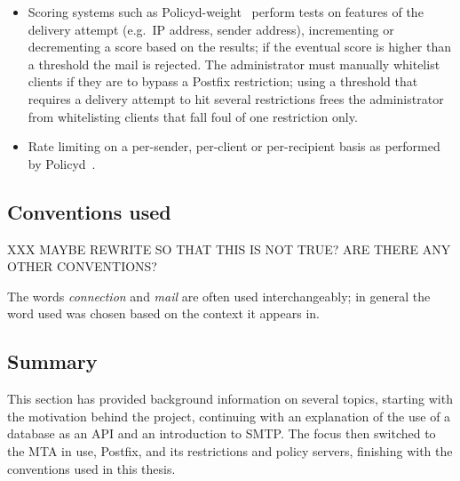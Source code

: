 \begin{itemize}
        \begin{table}[ht]
            \caption{Summary of rejections}\label{Summary of rejections}
            
        \end{table}

    \item Scoring systems such as Policyd-weight~\cite{policyd-weight}
        perform tests on features of the delivery attempt (e.g.\ \gls{IP}
        address, sender address), incrementing or decrementing a score
        based on the results; if the eventual score is higher than a
        threshold the mail is rejected.  The administrator must manually
        whitelist clients if they are to bypass a Postfix restriction;
        using a threshold that requires a delivery attempt to hit several
        restrictions frees the administrator from whitelisting clients that
        fall foul of one restriction only.

    \item Rate limiting on a per-sender, per-client or per-recipient basis
        as performed by Policyd~\cite{policyd}.

\end{itemize}



\subsection{Conventions used}

XXX MAYBE REWRITE SO THAT THIS IS NOT TRUE\@?  ARE THERE ANY OTHER
CONVENTIONS\@?

The words \textit{connection\/} and \textit{mail\/} are often used
interchangeably; in general the word used was chosen based
on the context it appears in.

\subsection{Summary}

This section has provided background information on several topics,
starting with the motivation behind the project, continuing with an
explanation of the use of a database as an \gls{API} and an introduction to
\gls{SMTP}.  The focus then switched to the \gls{MTA} in use, Postfix, and
its restrictions and policy servers, finishing with the conventions used in
this thesis.
